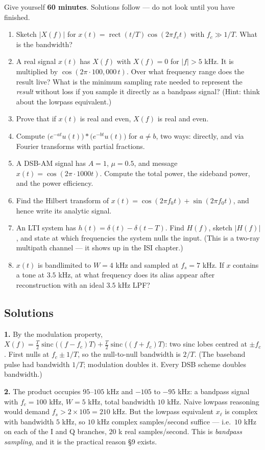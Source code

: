 \documentclass[11pt,a4paper]{article}
\newcommand{\sinc}{\operatorname{sinc}}
\newcommand{\rect}{\operatorname{rect}}
\begin{document}
Give yourself \textbf{60 minutes}. Solutions follow --- do not look until you have finished.

\begin{enumerate}[leftmargin=*,itemsep=6pt]
\item Sketch $|X(f)|$ for $x(t)=\rect(t/T)\cos(2\pi f_ct)$ with $f_c\gg1/T$. What is the bandwidth?
\item A real signal $x(t)$ has $X(f)$ with $X(f)=0$ for $|f|>5$ kHz. It is multiplied by $\cos(2\pi\cdot100{,}000\,t)$.
Over what frequency range does the result live? What is the minimum sampling rate needed to represent the
\emph{result} without loss if you sample it directly as a bandpass signal? (Hint: think about the lowpass
equivalent.)
\item Prove that if $x(t)$ is real and even, $X(f)$ is real and even.
\item Compute $\big(e^{-at}u(t)\big)*\big(e^{-bt}u(t)\big)$ for $a\neq b$, two ways: directly, and via
Fourier transforms with partial fractions.
\item A DSB-AM signal has $A=1$, $\mu=0.5$, and message $x(t)=\cos(2\pi\cdot1000t)$. Compute the total power,
the sideband power, and the power efficiency.
\item Find the Hilbert transform of $x(t)=\cos(2\pi f_0t)+\sin(2\pi f_0 t)$, and hence write its analytic signal.
\item An LTI system has $h(t)=\delta(t)-\delta(t-T)$. Find $H(f)$, sketch $|H(f)|$, and state at which
frequencies the system nulls the input. (This is a two-ray multipath channel --- it shows up in the ISI
chapter.)
\item $x(t)$ is bandlimited to $W=4$ kHz and sampled at $f_s=7$ kHz. If $x$ contains a tone at $3.5$ kHz, at
what frequency does its alias appear after reconstruction with an ideal $3.5$ kHz LPF?
\end{enumerate}

\subsection*{Solutions}

\textbf{1.} By the modulation property, $X(f)=\frac{T}{2}\sinc\big((f-f_c)T\big)+\frac{T}{2}\sinc\big((f+f_c)T\big)$:
two sinc lobes centred at $\pm f_c$. First nulls at $f_c\pm 1/T$, so the null-to-null bandwidth is $2/T$.
(The baseband pulse had bandwidth $1/T$; modulation doubles it. Every DSB scheme doubles bandwidth.)

\medskip
\textbf{2.} The product occupies $95$--$105$ kHz and $-105$ to $-95$ kHz: a bandpass signal with $f_c=100$ kHz,
$W=5$ kHz, total bandwidth $10$ kHz. Naive lowpass reasoning would demand $f_s>2\times105=210$ kHz. But the
lowpass equivalent $x_\ell$ is complex with bandwidth $5$ kHz, so $10$ kHz complex samples/second suffice ---
i.e.\ $10$ kHz on each of the I and Q branches, $20$ k real samples/second. This is \emph{bandpass sampling},
and it is the practical reason \S9 exists.
\end{document}

